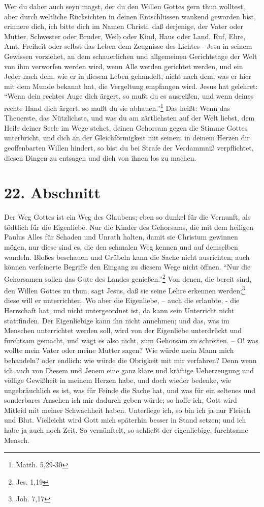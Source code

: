 Wer du daher auch seyn magst, der du den Willen Gottes gern thun wolltest, aber
durch weltliche Rücksichten in deinen Entschlüssen wankend geworden bist,
erinnere dich, ich bitte dich im Namen Christi, daß derjenige, der Vater oder
Mutter, Schwester oder Bruder, Weib oder Kind, Haus oder Land, Ruf, Ehre, Amt,
Freiheit oder selbst das Leben dem Zeugnisse des Lichtes - Jesu in seinem
Gewissen vorziehet, an dem schauerlichen und allgemeinen Gerichtstage der Welt
von ihm verworfen werden wird, wenn Alle werden gerichtet werden, und ein Jeder
nach dem, wie er in diesem Leben gehandelt, nicht nach dem, was er hier mit dem
Munde bekannt hat, die Vergeltung empfangen wird. Jesus hat gelehret: "`Wenn
dein rechtes Auge dich ärgert, so mußt du es ausreißen, und wenn deines rechte
Hand dich ärgert, so mußt du sie abhauen."'\footnote{Matth. 5,29-30} Das heißt:
Wenn das Theuerste, das Nützlichste, und was du am zärtlichsten auf der Welt
liebst, dem Heile deiner Seele im Wege stehet, deinen Gehorsam gegen die Stimme
Gottes unterbricht, und dich an der Gleichförmigkeit mit seinem in deinem Herzen
dir geoffenbarten Willen hindert, so bist du bei Strafe der Verdammniß
verpflichtet, diesen Dingen zu entsagen und dich von ihnen los zu machen.

\section{22. Abschnitt} \label{kap4_ab22}

Der Weg Gottes ist ein Weg des Glaubens; eben so dunkel für die Vernunft, als
tödtlich für die Eigenliebe. Nur die Kinder des Gehorsams, die mit dem heiligen
Paulus Alles für Schaden und Unrath halten, damit sie Christum gewinnen mögen,
nur diese sind es, die den schmalen Weg kennen und auf demselben wandeln. Bloßes
beschauen und Grübeln kann die Sache nicht ausrichten; auch können verfeinerte
Begriffe den Eingang zu diesem Wege nicht öffnen. "`Nur die Gehorsamen sollen
das Gute des Landes genießen."'\footnote{Jes. 1,19} Von denen, die bereit sind,
den Willen Gottes zu thun, sagt Jesus, daß sie seine Lehre erkennen
werden;\footnote{Joh. 7,17} diese will er unterrichten. Wo aber die Eigenliebe,
-- auch die erlaubte, - die Herrschaft hat, und nicht untergeordnet ist, da kann
sein Unterricht nicht stattfinden. Der Eigenliebige kann ihn nicht annehmen; und
das, was im Menschen unterrichtet werden soll, wird von der Eigenliebe
unterdrückt und furchtsam gemacht, und wagt es also nicht, zum Gehorsam zu
schreiten. -- O! was wollte mein Vater oder meine Mutter sagen? Wie würde mein
Mann mich behandeln? oder endlich: wie würde die Obrigkeit mit mir verfahren?
Denn wenn ich auch von Diesem und Jenem eine ganz klare und kräftige
Ueberzeugung und völlige Gewißheit in meinem Herzen habe, und doch wieder
bedenke, wie ungebräuchlich es ist, was für Feinde die Sache hat, und was für
ein seltenes und sonderbares Ansehen ich mir dadurch geben würde; so hoffe ich,
Gott wird Mitleid mit meiner Schwachheit haben. Unterliege ich, so bin ich ja
nur Fleisch und Blut. Vielleicht wird Gott mich späterhin besser in Stand
setzen; und ich habe ja auch noch Zeit. So vernünftelt, so schließt der
eigenliebige, furchtsame Mensch.

